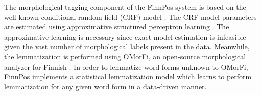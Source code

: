 \documentclass[smallextended]{svjour3}       %
\begin{document}


The morphological tagging component of the FinnPos system is based on the well-known conditional random field (CRF) model \citep{lafferty2001}. The CRF model parameters are estimated using approximative structured perceptron learning \citep{huang2012}.  
The approximative learning is necessary since exact model estimation is infeasible given the vast number of morphological labels present in the data.
Meanwhile, the lemmatization is performed using OMorFi, an open-source morphological analyzer for Finnish \citep{pirinen2008}. In order to lemmatize word forms unknown to OMorFi, FinnPos implements a statistical lemmatization model which learns to perform lemmatization for any given word form in a data-driven manner.

\end{document}

